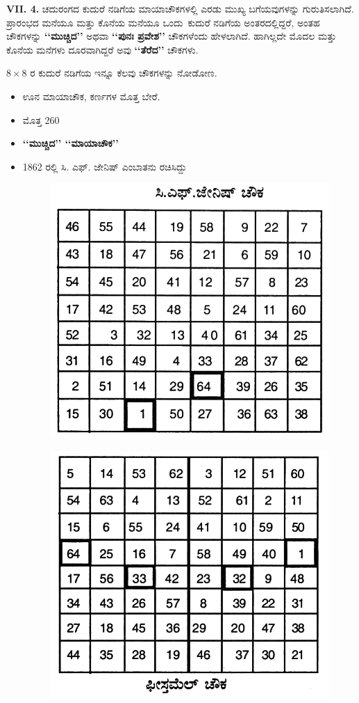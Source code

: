 \medskip
\textbf{VII. 4.} ಚದುರಂಗದ ಕುದುರೆ ನಡಿಗೆಯ ಮಾಯಾಚೌಕಗಳಲ್ಲಿ ಎರಡು ಮುಖ್ಯ ಬಗೆಯವುಗಳನ್ನು ಗುರುತಿಸಲಾಗಿದೆ. ಪ್ರಾರಂಭದ ಮನೆಯೂ ಮತ್ತು ಕೊನೆಯ ಮನೆಯೂ \hbox{ಒಂದು ಕುದುರೆ} ನಡಿಗೆಯ ಅಂತರದಲ್ಲಿದ್ದರೆ, ಅಂತಹ ಚೌಕಗಳನ್ನು  \textbf{‘‘ಮುಚ್ಚಿದ’’} ಅಥವಾ \textbf{‘‘ಪುನಃ ಪ್ರವೇಶ’’} ಚೌಕಗಳೆಂದು ಹೇಳಲಾಗಿದೆ. ಹಾಗಿಲ್ಲದೇ ಮೊದಲ ಮತ್ತು ಕೊನೆಯ ಮನೆಗಳು ದೂರವಾಗಿದ್ದರೆ ಅವು \textbf{‘‘ತೆರೆದ’’} ಚೌಕಗಳು.

$8 \times 8$ ರ ಕುದುರೆ ನಡಿಗೆಯ ಇನ್ನೂ ಕೆಲವು ಚೌಕಗಳನ್ನು ನೋಡೋಣ.
\begin{itemize}
	\item ಊನ ಮಾಯಾಚೌಕ, ಕರ್ಣಗಳ ಮೊತ್ತ ಬೇರೆ.
	\item ಮೊತ್ತ 260
	\item \textbf{‘‘ಮುಚ್ಚಿದ’’ ‘‘ಮಾಯಾಚೌಕ’’}
	\item 1862 ರಲ್ಲಿ ಸಿ. ಎಫ್. ಜೇನಿಷ್ ಎಂಬಾತನು ರಚಿಸಿದ್ದು
	\begin{figure}[H]
	\includegraphics[scale=.9]{src/figures/chap6/fig6-5.jpg}
	\end{figure}
	\begin{figure}[H]
	\includegraphics[scale=.9]{src/figures/chap6/fig6-6.jpg}

\end{figure}
\end{itemize}
